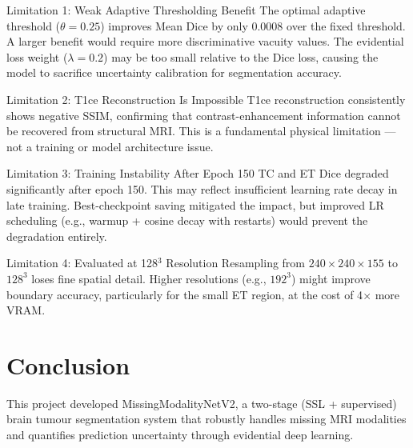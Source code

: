 \documentclass[12pt,a4paper]{article}
\begin{document}
\begin{warningbox}{Limitation 1: Weak Adaptive Thresholding Benefit}
The optimal adaptive threshold ($\theta = 0.25$) improves Mean Dice by only 0.0008 over the fixed threshold. A larger benefit would require more discriminative vacuity values. The evidential loss weight ($\lambda = 0.2$) may be too small relative to the Dice loss, causing the model to sacrifice uncertainty calibration for segmentation accuracy.
\end{warningbox}

\begin{warningbox}{Limitation 2: T1ce Reconstruction Is Impossible}
T1ce reconstruction consistently shows negative SSIM, confirming that contrast-enhancement information cannot be recovered from structural MRI. This is a fundamental physical limitation --- not a training or model architecture issue.
\end{warningbox}

\begin{warningbox}{Limitation 3: Training Instability After Epoch 150}
TC and ET Dice degraded significantly after epoch 150. This may reflect insufficient learning rate decay in late training. Best-checkpoint saving mitigated the impact, but improved LR scheduling (e.g., warmup + cosine decay with restarts) would prevent the degradation entirely.
\end{warningbox}

\begin{warningbox}{Limitation 4: Evaluated at 128$^3$ Resolution}
Resampling from $240\times240\times155$ to $128^3$ loses fine spatial detail. Higher resolutions (e.g., $192^3$) might improve boundary accuracy, particularly for the small ET region, at the cost of 4$\times$ more VRAM.
\end{warningbox}

\section{Conclusion}

This project developed MissingModalityNetV2, a two-stage (SSL + supervised) brain tumour segmentation system that robustly handles missing MRI modalities and quantifies prediction uncertainty through evidential deep learning.
\end{document}
